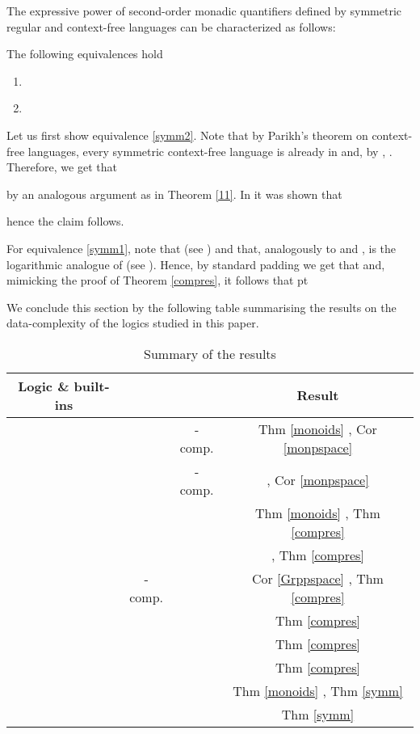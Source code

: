 \documentclass{LMCS}
\begin{document}
The expressive power of second-order monadic quantifiers defined by symmetric regular and context-free languages can be  characterized as follows:  
\begin{thm}\label{symm}The following equivalences hold
\begin{enumerate}[\em(1)]
 \item\label{symm1} 
\item\label{symm2} 
\end{enumerate}
\end{thm}
\proof Let us first show equivalence \ref{symm2}. Note that by Parikh's theorem on context-free languages, every symmetric context-free language is already in  and, by \cite{baimst90}, . Therefore, we get that 

by an analogous argument as in Theorem \ref{11}. In \cite{Kon3} it was shown that 

hence the claim follows. 

For equivalence \ref{symm1}, note that  (see \cite{baimst90}) and that, analogously to    and ,   is the logarithmic analogue of  (see \cite{algo94,all99}).  Hence, by standard padding  we get that  and, mimicking the proof of Theorem \ref{compres}, it follows that  
 pt

\noindent We conclude this section by the following table summarising the results on the  data-complexity of the logics studied in this paper. 
\begin{table}[h]
\caption{Summary of the results}
\centering
\begin{tabular}{|c| c| c|c| }
\hline \hline
Logic \& built-ins &  &  & Result  \\
\hline \hline
  &  & -comp. & Thm \ref{monoids} \cite{MR1908783}, Cor \ref{monpspace} \\

  &  & -comp. &\cite{bue62, tra61}, Cor \ref{monpspace}  \\
\hline
  &   &  & Thm \ref{monoids} \cite{MR1908783},  Thm \ref{compres}   \\

   &   &   & \cite{bue62, tra61},  Thm \ref{compres}  \\
\hline
  & -comp. &    &  Cor \ref{Grppspace} \cite{loh08},   Thm \ref{compres} \\

  &  & &  Thm \ref{compres}    \\
\hline
 &  & &   Thm \ref{compres}   \\

 &  & & Thm \ref{compres}    \\
\hline
 &  &  &  Thm \ref{monoids} \cite{MR1908783}, Thm \ref{symm}   \\

 &  & &Thm \ref{symm}    \\
\hline 
\end{tabular}
\label{table:summary}
\end{table}
\end{document}

